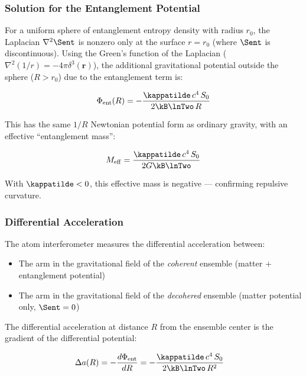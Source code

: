 \subsubsection{Solution for the Entanglement Potential}

For a uniform sphere of entanglement entropy density with radius $r_0$,
the Laplacian $\nabla^2\Sent$ is nonzero only at the surface $r = r_0$
(where $\Sent$ is discontinuous). Using the Green's function of the
Laplacian ($\nabla^2(1/r) = -4\pi\delta^3(\mathbf{r})$), the additional
gravitational potential outside the sphere ($R > r_0$) due to the
entanglement term is:

\begin{equation}
    \Phi_{\mathrm{ent}}(R) = -\frac{\kappatilde\,c^4\,S_0}
    {2\kB\lnTwo\,R}
    \label{eq:ent_potential}
\end{equation}

\noindent This has the same $1/R$ Newtonian potential form as ordinary
gravity, with an effective ``entanglement mass'':

\begin{equation}
    M_{\mathrm{eff}} = \frac{\kappatilde\,c^4\,S_0}{2G\kB\lnTwo}
    \label{eq:eff_mass}
\end{equation}

\noindent With $\kappatilde < 0$, this effective mass is negative ---
confirming repulsive curvature.

\subsubsection{Differential Acceleration}

The atom interferometer measures the differential acceleration between:
\begin{itemize}
    \item The arm in the gravitational field of the \emph{coherent}
    ensemble (matter + entanglement potential)
    \item The arm in the gravitational field of the \emph{decohered}
    ensemble (matter potential only, $\Sent = 0$)
\end{itemize}

The differential acceleration at distance $R$ from the ensemble center
is the gradient of the differential potential:

\begin{align}
    \Delta a(R) &= -\frac{d\Phi_{\mathrm{ent}}}{dR}
    = -\frac{\kappatilde\,c^4\,S_0}{2\kB\lnTwo\,R^2}
    \label{eq:delta_a_S0}
\end{align}


